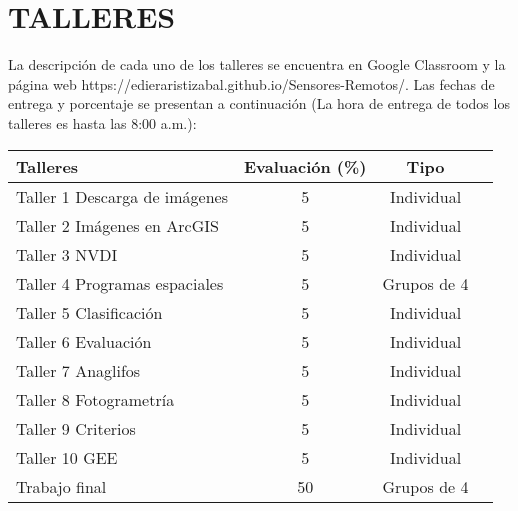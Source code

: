 \documentclass[a4paper,twoside,11pt,]{article}
\begin{document}
\section{TALLERES}
La descripción de cada uno de los talleres se encuentra en Google Classroom y la página web https://edieraristizabal.github.io/Sensores-Remotos/. Las fechas de entrega y porcentaje se presentan a continuación (La hora de entrega de todos los talleres es hasta las 8:00 a.m.):\\
\begin{table}[!hbt]
\label{tab-marks}
\begin{tabular}{|l|c|c|c|}
\hline {\bf Talleres} & {\bf Evaluación (\%)} & {\bf Tipo} \\
\hline Taller 1 Descarga de imágenes &  5 & Individual\\
\hline Taller 2 Imágenes en ArcGIS & 5 & Individual\\
\hline Taller 3 NVDI & 5 & Individual\\
\hline Taller 4 Programas espaciales &  5 & Grupos de 4\\
\hline Taller 5 Clasificación & 5 & Individual\\
\hline Taller 6 Evaluación & 5 & Individual\\
\hline Taller 7 Anaglifos &  5 & Individual\\
\hline Taller 8 Fotogrametría & 5 & Individual\\
\hline Taller 9 Criterios  & 5 & Individual\\
\hline Taller 10 GEE  & 5 & Individual\\
\hline Trabajo final & 50 & Grupos de 4\\
\hline
\end{tabular}
\end{table}
\end{document}
